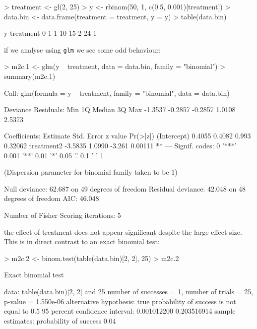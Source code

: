 \documentclass{article}
\begin{document}
\begin{Schunk}
\begin{Sinput}
> treatment <- gl(2, 25)
> y <- rbinom(50, 1, c(0.5, 0.001)[treatment])
> data.bin <- data.frame(treatment = treatment, y = y)
> table(data.bin)
\end{Sinput}
\begin{Soutput}
         y
treatment  0  1
        1 10 15
        2 24  1
\end{Soutput}
\end{Schunk}
 
if we analyse using \texttt{glm} we see some odd behaviour:

\begin{Schunk}
\begin{Sinput}
> m2c.1 <- glm(y ~ treatment, data = data.bin, family = "binomial")
> summary(m2c.1)
\end{Sinput}
\begin{Soutput}
Call:
glm(formula = y ~ treatment, family = "binomial", data = data.bin)

Deviance Residuals: 
    Min       1Q   Median       3Q      Max  
-1.3537  -0.2857  -0.2857   1.0108   2.5373  

Coefficients:
            Estimate Std. Error z value Pr(>|z|)   
(Intercept)   0.4055     0.4082   0.993  0.32062   
treatment2   -3.5835     1.0990  -3.261  0.00111 **
---
Signif. codes:  0 '***' 0.001 '**' 0.01 '*' 0.05 '.' 0.1 ' ' 1 

(Dispersion parameter for binomial family taken to be 1)

    Null deviance: 62.687  on 49  degrees of freedom
Residual deviance: 42.048  on 48  degrees of freedom
AIC: 46.048

Number of Fisher Scoring iterations: 5
\end{Soutput}
\end{Schunk}

the effect of treatment does not appear significant despite the large effect size. This is in direct contrast to an exact binomial test: 

\begin{Schunk}
\begin{Sinput}
> m2c.2 <- binom.test(table(data.bin)[2, 2], 25)
> m2c.2
\end{Sinput}
\begin{Soutput}
	Exact binomial test

data:  table(data.bin)[2, 2] and 25 
number of successes = 1, number of trials = 25, p-value = 1.550e-06
alternative hypothesis: true probability of success is not equal to 0.5 
95 percent confidence interval:
 0.001012200 0.203516914 
sample estimates:
probability of success 
                  0.04 
\end{Soutput}
\end{Schunk}
\end{document}
